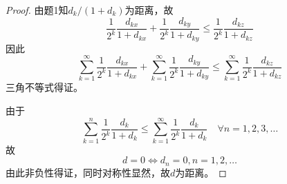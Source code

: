 \documentclass[cn]{homework}
\begin{document}
\begin{subproblem}
\begin{proof}
        由题1知$d_k/\left(1+d_k\right)$为距离，故
        \[\frac{1}{2^k}\frac{d_{kx}}{1+d_{kx}}
        +\frac{1}{2^k}\frac{d_{ky}}{1+d_{ky}}
        \leq \frac{1}{2^k}\frac{d_{kz}}{1+d_{kz}}\]
        因此
        \[
            \sum_{k=1}^\infty\frac{1}{2^k}\frac{d_{kx}}{1+d_{kx}}
            +\sum_{k=1}^\infty\frac{1}{2^k}\frac{d_{ky}}{1+d_{ky}}
            \leq\sum_{k=1}^\infty\frac{1}{2^k}\frac{d_{kz}}{1+d_{kz}}
        \]
        三角不等式得证。

        由于
        \[\sum_{k=1}^n\frac{1}{2^k}\frac{d_k}{1+d_k}
        \leq\sum_{k=1}^\infty\frac{1}{2^k}\frac{d_k}{1+d_k}
        \quad\forall n=1,2,3,\ldots\]
        故
        \[d=0\Leftrightarrow d_n=0,n=1,2,\ldots\]
        由此非负性得证，同时对称性显然，故$d$为距离。
        \end{proof}
    \end{subproblem}
\end{document}
